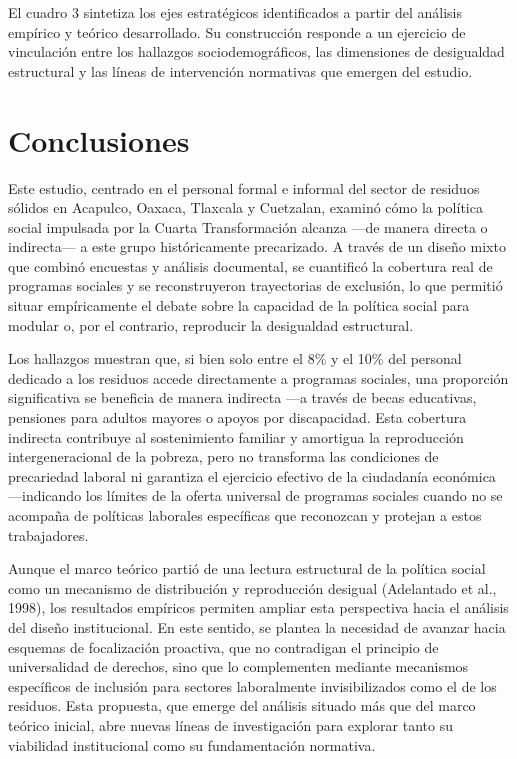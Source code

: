 \documentclass[
  spanish,
  11.5pt,
  170mm x 240mmpaper,
]{scrbook}
\begin{document}
\endgroup

El cuadro 3 sintetiza los ejes estratégicos identificados a partir del
análisis empírico y teórico desarrollado. Su construcción responde a un
ejercicio de vinculación entre los hallazgos sociodemográficos, las
dimensiones de desigualdad estructural y las líneas de intervención
normativas que emergen del estudio.


\chapter{Conclusiones}\label{conclusiones}

Este estudio, centrado en el personal formal e informal del sector de
residuos sólidos en Acapulco, Oaxaca, Tlaxcala y Cuetzalan, examinó cómo
la política social impulsada por la Cuarta Transformación alcanza ---de
manera directa o indirecta--- a este grupo históricamente precarizado. A
través de un diseño mixto que combinó encuestas y análisis documental,
se cuantificó la cobertura real de programas sociales y se
reconstruyeron trayectorias de exclusión, lo que permitió situar
empíricamente el debate sobre la capacidad de la política social para
modular o, por el contrario, reproducir la desigualdad estructural.

Los hallazgos muestran que, si bien solo entre el 8\% y el 10\% del
personal dedicado a los residuos accede directamente a programas
sociales, una proporción significativa se beneficia de manera indirecta
---a través de becas educativas, pensiones para adultos mayores o apoyos
por discapacidad. Esta cobertura indirecta contribuye al sostenimiento
familiar y amortigua la reproducción intergeneracional de la pobreza,
pero no transforma las condiciones de precariedad laboral ni garantiza
el ejercicio efectivo de la ciudadanía económica ---indicando los
límites de la oferta universal de programas sociales cuando no se
acompaña de políticas laborales específicas que reconozcan y protejan a
estos trabajadores.

Aunque el marco teórico partió de una lectura estructural de la política
social como un mecanismo de distribución y reproducción desigual
(Adelantado et al., 1998), los resultados empíricos permiten ampliar
esta perspectiva hacia el análisis del diseño institucional. En este
sentido, se plantea la necesidad de avanzar hacia esquemas de
focalización proactiva, que no contradigan el principio de universalidad
de derechos, sino que lo complementen mediante mecanismos específicos de
inclusión para sectores laboralmente invisibilizados como el de los
residuos. Esta propuesta, que emerge del análisis situado más que del
marco teórico inicial, abre nuevas líneas de investigación para explorar
tanto su viabilidad institucional como su fundamentación normativa.
\end{document}

